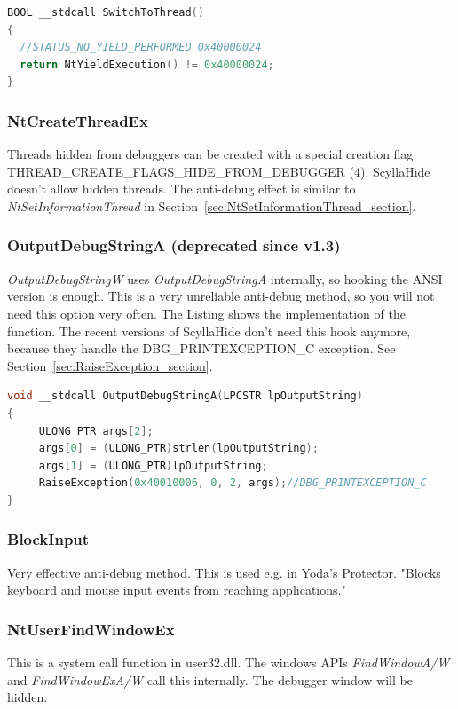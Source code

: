 \documentclass[10pt,a4paper]{article}
\begin{document}
\begin{lstlisting}[language=C, caption=SwitchToThread Implementation]
BOOL __stdcall SwitchToThread()
{
  //STATUS_NO_YIELD_PERFORMED 0x40000024
  return NtYieldExecution() != 0x40000024;
}
\end{lstlisting}

\subsubsection{NtCreateThreadEx}
Threads hidden from debuggers can be created with a special creation flag THREAD\_CREATE\_FLAGS\_HIDE\_FROM\_DEBUGGER (4). ScyllaHide doesn't allow hidden threads. The anti-debug effect is similar to \textit{NtSetInformationThread} in Section~\ref{sec:NtSetInformationThread_section}.

\subsubsection{OutputDebugStringA (deprecated since v1.3)}
\textit{OutputDebugStringW} uses \textit{OutputDebugStringA} internally, so hooking the ANSI version is enough. This is a very unreliable anti-debug method, so you will not need this option very often. The Listing shows the implementation of the function. The recent versions of ScyllaHide don't need this hook anymore, because they handle the DBG\_PRINTEXCEPTION\_C exception. See Section~\ref{sec:RaiseException_section}.

\begin{lstlisting}[language=C, caption=OutputDebugStringA Implementation]
void __stdcall OutputDebugStringA(LPCSTR lpOutputString)
{
     ULONG_PTR args[2];
     args[0] = (ULONG_PTR)strlen(lpOutputString);
     args[1] = (ULONG_PTR)lpOutputString;
     RaiseException(0x40010006, 0, 2, args);//DBG_PRINTEXCEPTION_C
}
\end{lstlisting}

\subsubsection{BlockInput}
Very effective anti-debug method. This is used e.g. in Yoda's Protector. "Blocks keyboard and mouse input events from reaching applications."

\subsubsection{NtUserFindWindowEx}
This is a system call function in user32.dll. The windows APIs \textit{FindWindowA/W} and \textit{FindWindowExA/W} call this internally. The debugger window will be hidden.
\end{document}
